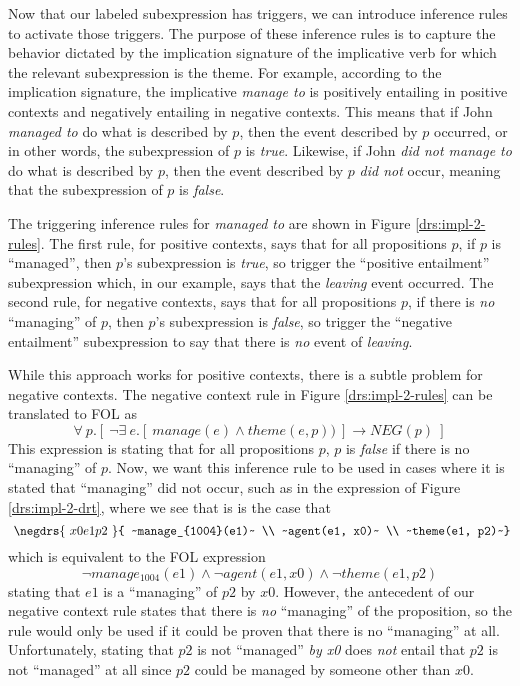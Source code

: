 Now that our labeled subexpression has triggers, we can introduce inference
rules to activate those triggers.  The purpose of these inference rules is to
capture the behavior dictated by the implication signature of the implicative
verb for which the relevant subexpression is the theme.  For example, according
to the implication signature, the implicative {\it manage to} is positively
entailing in positive contexts and negatively entailing in negative contexts.
This means that if John {\it managed to} do what is described by $p$, then the
event described by $p$ occurred, or in other words, the subexpression of $p$ is
{\it true}. Likewise, if John {\it did not manage to} do what is described by
$p$, then the event described by $p$ {\it did not} occur, meaning that the
subexpression of $p$ is {\it false}.  

The triggering inference rules for {\it managed to} are shown in Figure
\ref{drs:impl-2-rules}.  The first rule, for positive contexts, says that for
all propositions $p$, if $p$ is ``managed'', then $p$'s subexpression is {\it
true}, so trigger the ``positive entailment'' subexpression which, in our
example, says that the {\it leaving} event occurred.  The second rule, for
negative contexts, says that for all propositions $p$, if there is {\it no}
``managing'' of $p$, then $p$'s subexpression is {\it false}, so trigger the
``negative entailment'' subexpression to say that there is {\it no} event of
{\it leaving}.

While this approach works for positive contexts, there is a subtle problem for
negative contexts.  The negative context rule in Figure \ref{drs:impl-2-rules}
can be translated to FOL as \[ \forall~ p.[~ \lnot \exists~ e.[~ manage(e) \land
theme(e,p)) ~] \to NEG(p) ~] \] This expression is stating that for all
propositions $p$, $p$ is {\it false} if there is no ``managing'' of $p$.  Now,
we want this inference rule to be used in cases where it is stated that
``managing'' did not occur, such as in the expression of Figure
\ref{drs:impl-2-drt}, where we see that is is the case that \[ ~\negdrs{~x0 e1
p2~}{ ~manage_{1004}(e1)~ \\ ~agent(e1, x0)~ \\ ~theme(e1, p2)~} \] which is
equivalent to the FOL expression \[ \lnot manage_{1004}(e1) \land \lnot
agent(e1, x0) \land \lnot theme(e1, p2) \] stating that $e1$ is a ``managing''
of $p2$ by $x0$.  However, the antecedent of our negative context rule states
that there is {\it no} ``managing'' of the proposition, so the rule would only
be used if it could be proven that there is no ``managing'' at all.
Unfortunately, stating that $p2$ is not ``managed'' {\it by x0} does {\it not}
entail that $p2$ is not ``managed'' at all since $p2$ could be managed by
someone other than $x0$.

